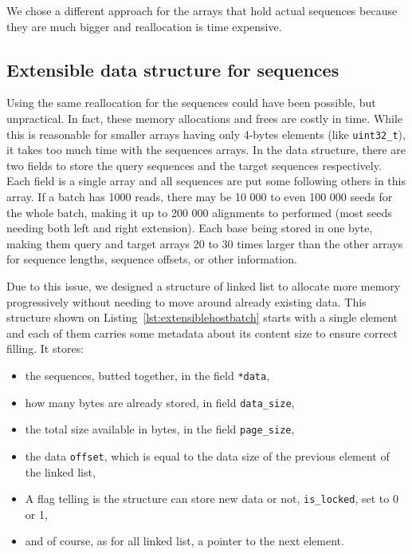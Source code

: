 We chose a different approach for the arrays that hold actual sequences because they are much bigger and reallocation is time expensive.

\subsection{Extensible data structure for sequences}

Using the same reallocation for the sequences could have been possible, but unpractical. In fact, these memory allocations and frees are costly in time. While this is reasonable for smaller arrays having only 4-bytes elements (like \verb|uint32_t|), it takes too much time with the sequences arrays. In the data structure, there are two fields to store the query sequences and the target sequences respectively. Each field is a single array and all sequences are put some following others in this array. If a batch has 1000 reads, there may be 10 000 to even 100 000 seeds for the whole batch, making it up to 200 000 alignments to performed (most seeds needing both left and right extension). Each base being stored in one byte, making them query and target arrays 20 to 30 times larger than the other arrays for sequence lengths, sequence offsets, or other information.

Due to this issue, we designed a structure of linked list to allocate more memory progressively without needing to move around already existing data. This structure shown on Listing~\ref{lst:extensiblehostbatch} starts with a single element and each of them carries some metadata about its content size to ensure correct filling. It stores:

\begin{itemize}
	\item the sequences, butted together, in the field \verb|*data|,
	\item how many bytes are already stored, in field \verb|data_size|,
	\item the total size available in bytes, in the field \verb|page_size|,
	\item the data \verb|offset|, which is equal to the data size of the previous element of the linked list,
	\item A flag telling is the structure can store new data or not, \verb|is_locked|, set to 0 or 1,
	\item and of course, as for all linked list, a pointer to the next element.
\end{itemize}

